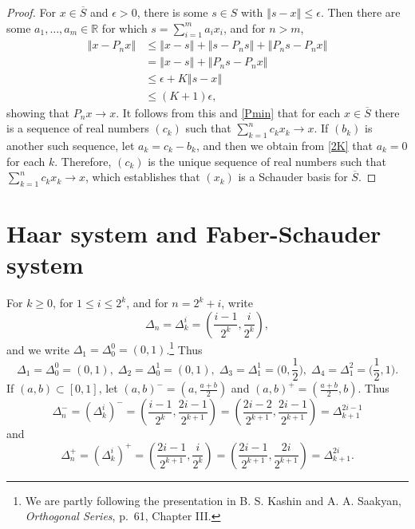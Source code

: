 \documentclass{article}
\newcommand{\norm}[1]{\left\Vert #1 \right\Vert}
\theoremstyle{definition}
\theoremstyle{definition}
\begin{document}
\begin{proof}
For $x \in \overline{S}$ and $\epsilon>0$, there is 
some $s \in S$ with $\norm{s-x} \leq \epsilon$. 
Then there are some $a_1,\ldots,a_m \in \mathbb{R}$ for which $s = \sum_{i=1}^m a_i x_i$, and for $n>m$,
\begin{align*}
\norm{x-P_n x}&\leq \norm{x-s}+\norm{s-P_n s}+\norm{P_n s-  P_n x}\\
&=  \norm{x-s} +\norm{P_n s -P_n x}\\
&\leq \epsilon+K \norm{s-x}\\
&\leq (K+1)\epsilon,
\end{align*}
showing that $P_n x \to x$. It follows from this and \eqref{Pmin} that for each $x \in \overline{S}$ there is a sequence
of real numbers $(c_k)$ such that $\sum_{k=1}^n c_k x_k \to x$. 
If $(b_k)$ is another such sequence, let $a_k=c_k-b_k$, and then we obtain from \eqref{2K}
that $a_k=0$ for each $k$. Therefore, $(c_k)$ is the unique sequence of real numbers such that
$\sum_{k=1}^n c_k x_k \to x$, which establishes that $(x_k)$ is a Schauder basis for $\overline{S}$.
\end{proof}



\section{Haar system and Faber-Schauder system}
For $k \geq 0$, for $1 \leq i \leq 2^k$, and for $n=2^k+i$, write
\[
\Delta_n = \Delta_k^i = \left( \frac{i-1}{2^k},\frac{i}{2^k}\right),
\]
and we write $\Delta_1 = \Delta_0^0 = (0,1)$.\footnote{We are partly following the presentation in
B. S. Kashin and A. A. Saakyan, {\em Orthogonal Series}, p.~61, Chapter III.}
Thus
\[
\Delta_1 = \Delta_0^0 = (0,1),\; \Delta_2 = \Delta_0^1 = (0,1),
\; \Delta_3 = \Delta_1^1 = \Big(0,\frac{1}{2}\Big),
\; \Delta_4 = \Delta_1^2 = \Big(\frac{1}{2},
1\Big). 
\]
If $(a,b) \subset [0,1]$, let $(a,b)^- = \left(a,\frac{a+b}{2}\right)$ and $(a,b)^+=\left(\frac{a+b}{2},b\right)$. 
Thus
\[
\Delta_n^-=(\Delta_k^i)^-=\left(\frac{i-1}{2^k}, \frac{2i-1}{2^{k+1}}\right) 
=\left(\frac{2i-2}{2^{k+1}},  \frac{2i-1}{2^{k+1}}\right) 
=\Delta_{k+1}^{2i-1}
\]
and
\[
\Delta_n^+=(\Delta_k^i)^+=\left(\frac{2i-1}{2^{k+1}}, \frac{i}{2^{k}}\right) 
=\left(\frac{2i-1}{2^{k+1}},  \frac{2i}{2^{k+1}}\right) 
=\Delta_{k+1}^{2i}.
\]
\end{document}
